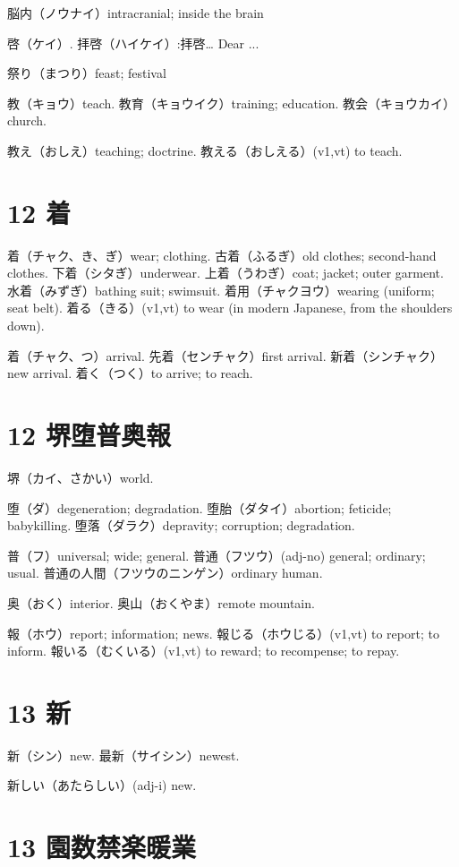 脳内（ノウナイ）intracranial; inside the brain

啓（ケイ）.
拝啓（ハイケイ）:拝啓… Dear ...

祭り（まつり）feast; festival

教（キョウ）teach.
教育（キョウイク）training; education.
教会（キョウカイ）church.

教え（おしえ）teaching; doctrine.
教える（おしえる）(v1,vt) to teach.

\section{12 着}

着（チャク、き、ぎ）wear; clothing.
古着（ふるぎ）old clothes; second-hand clothes.
下着（シタぎ）underwear.
上着（うわぎ）coat; jacket; outer garment.
水着（みずぎ）bathing suit; swimsuit.
着用（チャクヨウ）wearing (uniform; seat belt).
着る（きる）(v1,vt) to wear (in modern Japanese, from the shoulders down).

着（チャク、つ）arrival.
先着（センチャク）first arrival.
新着（シンチャク）new arrival.
着く（つく）to arrive; to reach.

\section{12 堺堕普奥報}

堺（カイ、さかい）world.

堕（ダ）degeneration; degradation.
堕胎（ダタイ）abortion; feticide; babykilling.
堕落（ダラク）depravity; corruption; degradation.

普（フ）universal; wide; general.
普通（フツウ）(adj-no) general; ordinary; usual.
普通の人間（フツウのニンゲン）ordinary human.

奥（おく）interior.
奥山（おくやま）remote mountain.

報（ホウ）report; information; news.
報じる（ホウじる）(v1,vt) to report; to inform.
報いる（むくいる）(v1,vt) to reward; to recompense; to repay.

\section{13 新}

新（シン）new.
最新（サイシン）newest.

新しい（あたらしい）(adj-i) new.

\section{13 園数禁楽暖業}

